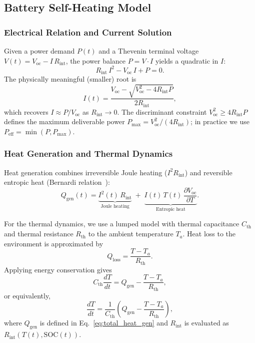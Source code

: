 \documentclass{mcmthesis}
\begin{document}
\subsection{Battery Self-Heating Model}
\label{sec:self_heating}

\subsubsection{Electrical Relation and Current Solution}
Given a power demand $P(t)$ and a Thevenin terminal voltage $V(t) = V_{\mathrm{oc}} - I\,R_{\mathrm{int}}$, the power balance $P = V \cdot I$ yields a quadratic in $I$:
\begin{equation}
R_{\mathrm{int}}\,I^2 - V_{\mathrm{oc}}\,I + P = 0.
\end{equation}
The physically meaningful (smaller) root is
\begin{equation}
\label{eq:I_solution}
I(t)=\frac{V_{\mathrm{oc}}-\sqrt{V_{\mathrm{oc}}^2-4R_{\mathrm{int}}P}}{2R_{\mathrm{int}}},
\end{equation}
which recovers $I \approx P/V_{\mathrm{oc}}$ as $R_{\mathrm{int}}\to 0$. The discriminant constraint $V_{\mathrm{oc}}^2 \geq 4R_{\mathrm{int}}P$ defines the maximum deliverable power $P_{\max}=V_{\mathrm{oc}}^2/(4R_{\mathrm{int}})$; in practice we use $P_{\mathrm{eff}}=\min(P,P_{\max})$.

\subsubsection{Heat Generation and Thermal Dynamics}
Heat generation combines irreversible Joule heating ($I^2 R_{\mathrm{int}}$) and reversible entropic heat (Bernardi relation~\cite{ref16}):
\begin{equation}
Q_{\mathrm{gen}}(t) = \underbrace{I^2(t)\,R_{\mathrm{int}}}_{\text{Joule heating}} \;+\;
\underbrace{I(t)\,T(t)\,\frac{\partial V_{\mathrm{oc}}}{\partial T}}_{\text{Entropic heat}}.
\label{eq:total_heat_gen}
\end{equation}

For the thermal dynamics, we use a lumped model with thermal capacitance $C_{\mathrm{th}}$ and thermal resistance $R_{\mathrm{th}}$ to the ambient temperature $T_a$. Heat loss to the environment is approximated by
\[
Q_{\mathrm{loss}}=\frac{T-T_a}{R_{\mathrm{th}}}.
\]
Applying energy conservation gives
\begin{equation}
C_{\mathrm{th}}\frac{dT}{dt}=Q_{\mathrm{gen}}-\frac{T-T_a}{R_{\mathrm{th}}},
\end{equation}
or equivalently,
\begin{equation}
\label{eq:thermal_ode}
\frac{dT}{dt}=\frac{1}{C_{\mathrm{th}}}\left(Q_{\mathrm{gen}}-\frac{T-T_a}{R_{\mathrm{th}}}\right),
\end{equation}
where $Q_{\mathrm{gen}}$ is defined in Eq.~\eqref{eq:total_heat_gen} and $R_{\mathrm{int}}$ is evaluated as $R_{\mathrm{int}}(T(t),\mathrm{SOC}(t))$.
\end{document}
